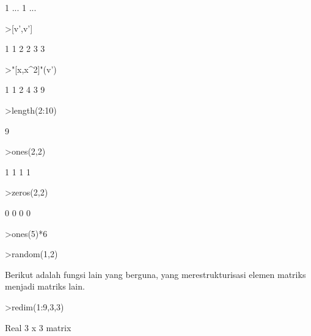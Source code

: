 \documentclass[a4paper,10pt]{article}
\begin{document}
\begin{eulernotebook}
\begin{eulercomment}
\begin{eulercomment}
\begin{eulercomment}
\begin{eulercomment}
\begin{euleroutput}
                        1     ...
                        1     ...
\end{euleroutput}
\begin{eulerprompt}
>[v',v']
\end{eulerprompt}
\begin{euleroutput}
                        1                       1 
                        2                       2 
                        3                       3 
\end{euleroutput}
\begin{eulerprompt}
>"[x,x^2]"(v')
\end{eulerprompt}
\begin{euleroutput}
                        1                       1 
                        2                       4 
                        3                       9 
\end{euleroutput}
\begin{eulerprompt}
>length(2:10)
\end{eulerprompt}
\begin{euleroutput}
  9
\end{euleroutput}
\begin{eulerprompt}
>ones(2,2)
\end{eulerprompt}
\begin{euleroutput}
                        1                       1 
                        1                       1 
\end{euleroutput}
\begin{eulerprompt}
>zeros(2,2)
\end{eulerprompt}
\begin{euleroutput}
                        0                       0 
                        0                       0 
\end{euleroutput}
\begin{eulerprompt}
>ones(5)*6
\end{eulerprompt}
\begin{euleroutput}
  [6,  6,  6,  6,  6]
\end{euleroutput}
\begin{eulerprompt}
>random(1,2)
\end{eulerprompt}
\begin{euleroutput}
  [0.217693385437102,  0.4453627564273003]
\end{euleroutput}
\begin{eulercomment}
Berikut adalah fungsi lain yang berguna, yang merestrukturisasi elemen
matriks menjadi matriks lain.
\end{eulercomment}
\begin{eulerprompt}
>redim(1:9,3,3)
\end{eulerprompt}
\begin{euleroutput}
  Real 3 x 3 matrix
  

\end{euleroutput}
\end{eulercomment}
\end{eulercomment}
\end{eulercomment}
\end{eulercomment}
\end{eulernotebook}
\end{document}
